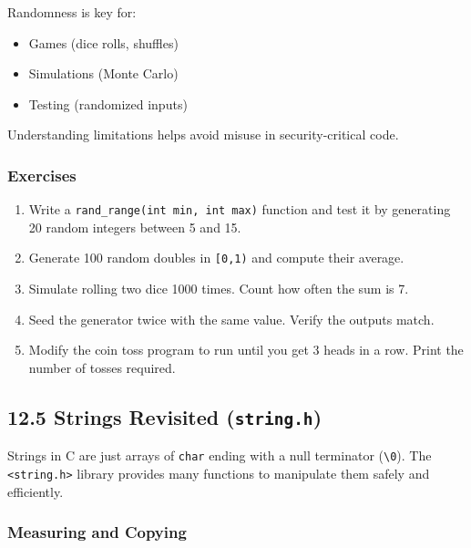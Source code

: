 \documentclass[
  letterpaper,
  DIV=11,
  numbers=noendperiod]{scrreprt}
\providecommand{\tightlist}{%
  \setlength{\itemsep}{0pt}\setlength{\parskip}{0pt}}
\begin{document}
Randomness is key for:

\begin{itemize}
\tightlist
\item
  Games (dice rolls, shuffles)
\item
  Simulations (Monte Carlo)
\item
  Testing (randomized inputs)
\end{itemize}

Understanding limitations helps avoid misuse in security-critical code.

\subsubsection{Exercises}\label{exercises-58}

\begin{enumerate}
\def\labelenumi{\arabic{enumi}.}
\tightlist
\item
  Write a \texttt{rand\_range(int\ min,\ int\ max)} function and test it
  by generating 20 random integers between 5 and 15.
\item
  Generate 100 random doubles in \texttt{{[}0,1)} and compute their
  average.
\item
  Simulate rolling two dice 1000 times. Count how often the sum is 7.
\item
  Seed the generator twice with the same value. Verify the outputs
  match.
\item
  Modify the coin toss program to run until you get 3 heads in a row.
  Print the number of tosses required.
\end{enumerate}

\subsection{\texorpdfstring{12.5 Strings Revisited
(\texttt{string.h})}{12.5 Strings Revisited (string.h)}}\label{strings-revisited-string.h}

Strings in C are just arrays of \texttt{char} ending with a null
terminator
(\texttt{\textquotesingle{}\textbackslash{}0\textquotesingle{}}). The
\texttt{\textless{}string.h\textgreater{}} library provides many
functions to manipulate them safely and efficiently.

\subsubsection{Measuring and Copying}\label{measuring-and-copying}
\end{document}
